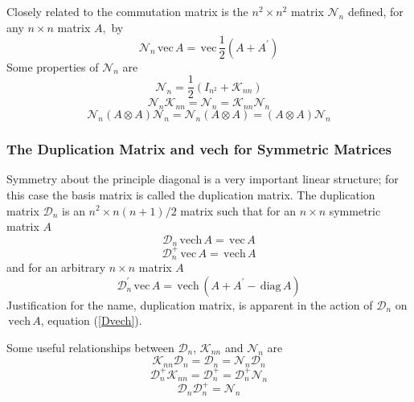 \documentclass[12pt,thmsa,suthesis,verbatim]{report}
\begin{document}
Closely related to the commutation matrix is the $n^2\times n^2$ matrix $%
\mathcal{N}_n$ defined, for any $n\times n$ matrix $A,$ by 
\begin{equation}
\mathcal{N}_n\,\mathrm{vec}\,A=\,\mathrm{vec}\,\frac 12\left( A+A^{\prime
}\right)
\end{equation}
Some properties of $\mathcal{N}_n$ are 
\begin{equation}
\mathcal{N}_n=\frac 12\left( I_{n^2}+\mathcal{K}_{nn}\right)
\end{equation}
\begin{equation}
\mathcal{N}_n\mathcal{K}_{nn}=\mathcal{N}_n=\mathcal{K}_{nn}\mathcal{N}_n
\end{equation}
\begin{equation}
\mathcal{N}_n\left( A\otimes A\right) \mathcal{N}_n=\mathcal{N}_n\left(
A\otimes A\right) =\left( A\otimes A\right) \mathcal{N}_n
\end{equation}

\subsubsection{The Duplication Matrix and vech for Symmetric Matrices}

Symmetry about the principle diagonal is a very important linear structure;
for this case the basis matrix is called the duplication matrix. The
duplication matrix $\mathcal{D}_n$ is an $n^2\times n(n+1)/2$ matrix such
that for an $n\times n$ symmetric matrix $A$%
\begin{equation}
\mathcal{D}_n\,\mathrm{vech}\,A=\,\mathrm{vec}\,A  \label{Dvech}
\end{equation}
\begin{equation}
\mathcal{D}_n^{+}\,\mathrm{vec}\,A=\,\mathrm{vech}\,A
\end{equation}
and for an arbitrary $n\times n$ matrix $A$%
\begin{equation}
\mathcal{D}_n^{\prime }\,\mathrm{vec}\,A=\,\mathrm{vech}\,\left( A+A^{\prime
}-\,\mathrm{diag}\,A\right)
\end{equation}
Justification for the name, duplication matrix, is apparent in the action of 
$\mathcal{D}_n$ on $\,\mathrm{vech}\,A$, equation (\ref{Dvech}).

Some useful relationships between $\mathcal{D}_n$, $\mathcal{K}_{nn}$ and $%
\mathcal{N}_n$ are 
\begin{equation}
\mathcal{K}_{nn}\mathcal{D}_n=\mathcal{D}_n=\mathcal{N}_n\mathcal{D}_n
\end{equation}
\begin{equation}
\mathcal{D}_n^{+}\mathcal{K}_{nn}=\mathcal{D}_n^{+}=\mathcal{D}_n^{+}%
\mathcal{N}_n
\end{equation}
\begin{equation}
\mathcal{D}_n\mathcal{D}_n^{+}=\mathcal{N}_n
\end{equation}
\end{document}
